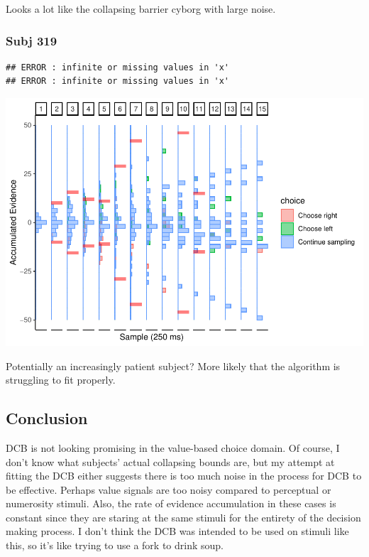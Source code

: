 \documentclass[
]{book}
\begin{document}
Looks a lot like the collapsing barrier cyborg with large noise.

\hypertarget{subj-319}{%
\subsubsection*{Subj 319}\label{subj-319}}

\begin{verbatim}
## ERROR : infinite or missing values in 'x' 
## ERROR : infinite or missing values in 'x'
\end{verbatim}

\includegraphics{LateNightBayes_files/figure-latex/unnamed-chunk-32-1.pdf}

Potentially an increasingly patient subject? More likely that the algorithm is struggling to fit properly.

\hypertarget{conclusion-3}{%
\subsection{Conclusion}\label{conclusion-3}}

DCB is not looking promising in the value-based choice domain. Of course, I don't know what subjects' actual collapsing bounds are, but my attempt at fitting the DCB either suggests there is too much noise in the process for DCB to be effective. Perhaps value signals are too noisy compared to perceptual or numerosity stimuli. Also, the rate of evidence accumulation in these cases is constant since they are staring at the same stimuli for the entirety of the decision making process. I don't think the DCB was intended to be used on stimuli like this, so it's like trying to use a fork to drink soup.
\end{document}
